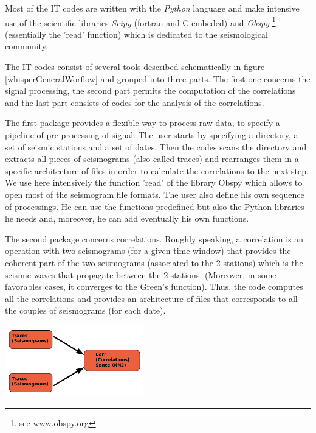 \documentclass[a4paper, 10pt]{article}
\begin{document}
\begin{multicols}{2}
Most of the IT codes are written with the \emph{Python} language and make intensive use of the scientific libraries \emph{Scipy} (fortran and C embeded) 
and \emph{Obspy} \footnote{ see www.obspy.org} (essentially the 'read' function) which is dedicated to the seismological community. 

The IT codes consist of several tools described schematically in figure \ref{whisperGeneralWorflow} and grouped into three parts. The first one concerns the signal processing, the second part permits the computation of the correlations and the last part consists of codes for the analysis of the correlations.

The first package provides a flexible way to process raw data, to specify a pipeline of pre-processing of signal.
The user starts by specifying a directory, a set of seismic stations and a set of dates. Then the codes scans the directory
and extracts all pieces of seismograms (also called traces) and rearranges them in a specific architecture of files in order to calculate the correlations to the next step.
We use here intensively the function 'read' of the library Obspy which allows to open most of the seismogram file formats.
The user also define his own sequence of processings. He can use the functions predefined but also the Python libraries he needs and,
moreover, he can add eventually his own functions.

The second package concerns correlations. 
Roughly speaking, a correlation is an operation with two seismograms (for a given time window) that provides the coherent part of the two seismograms 
(associated to the 2 stations) which is the seismic waves that propagate between the 2 stations.
(Moreover, in some favorables cases, it converges to the Green's function). 
Thus, the code computes all the correlations and provides an architecture of files that corresponds to all the couples of seismograms (for each date). 

\begin{center}%
\centering
{}
\includegraphics[width=6cm]{schemaCorrelationStep.png}
\end{center}


\end{multicols}
\end{document}
